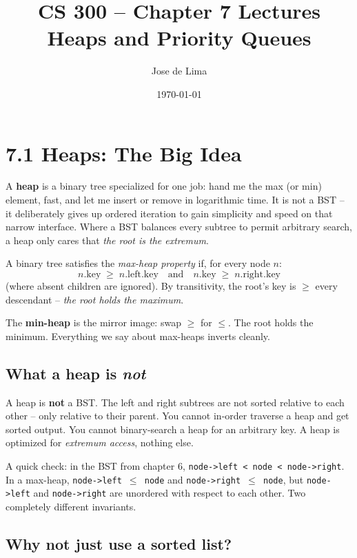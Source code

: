 \documentclass[11pt]{article}
\title{CS 300 -- Chapter 7 Lectures\\\large Heaps and Priority Queues}
\author{Jose de Lima}
\date{\today}
\begin{document}
\maketitle

\section{7.1 Heaps: The Big Idea}

A \textbf{heap} is a binary tree specialized for one job: hand me the max (or min) element, fast, and let me insert or remove in logarithmic time. It is not a BST -- it deliberately gives up ordered iteration to gain simplicity and speed on that narrow interface. Where a BST balances every subtree to permit arbitrary search, a heap only cares that \emph{the root is the extremum}.

\begin{defnbox}
A binary tree satisfies the \emph{max-heap property} if, for every node $n$:
\[
n.\text{key} \;\ge\; n.\text{left}.\text{key}
\quad \text{and} \quad
n.\text{key} \;\ge\; n.\text{right}.\text{key}
\]
(where absent children are ignored). By transitivity, the root's key is $\ge$ every descendant -- \emph{the root holds the maximum}.
\end{defnbox}

The \textbf{min-heap} is the mirror image: swap $\ge$ for $\le$. The root holds the minimum. Everything we say about max-heaps inverts cleanly.

\subsection*{What a heap is \emph{not}}

\begin{warnbox}
A heap is \textbf{not} a BST. The left and right subtrees are not sorted relative to each other -- only relative to their parent. You cannot in-order traverse a heap and get sorted output. You cannot binary-search a heap for an arbitrary key. A heap is optimized for \emph{extremum access}, nothing else.
\end{warnbox}

A quick check: in the BST from chapter 6, \texttt{node->left < node < node->right}. In a max-heap, \texttt{node->left $\le$ node} and \texttt{node->right $\le$ node}, but \texttt{node->left} and \texttt{node->right} are unordered with respect to each other. Two completely different invariants.

\subsection*{Why not just use a sorted list?}
\end{document}
